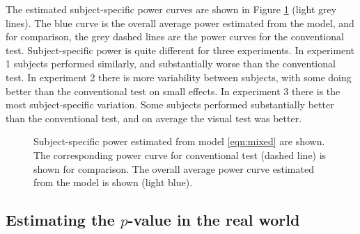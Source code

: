 \documentclass[12pt]{article}
\newcommand{\blue}[1]{{\color{blue} #1}} %
\newcommand{\green}[1]{{\color{green} #1}} %
\begin{document}
 The estimated subject-specific power curves are shown in \blue{Figure \ref{fig:power_mixed_subject} (light grey lines). The blue curve is the overall} average power estimated from the model, and for comparison, the grey dashed lines are the power curves for the conventional test. Subject-specific power is quite different for three experiments. In experiment 1 subjects performed similarly, and substantially worse than the conventional test. In experiment 2 there is more variability between subjects, with some doing better than the conventional test on small effects. In experiment 3 there is the most subject-specific variation. Some subjects performed substantially better than the conventional test, and on average the visual test was better. 

\begin{figure}[hbtp]
   \centering
       \caption{Subject-specific  power estimated from model \ref{eqn:mixed} are shown. The corresponding power curve for conventional test (dashed line) is shown for comparison. The overall average power curve estimated from the model is shown (light blue).}
       \label{fig:power_mixed_subject}
\end{figure}


\subsection{Estimating the $p$-value in the real world} 

\end{document}

